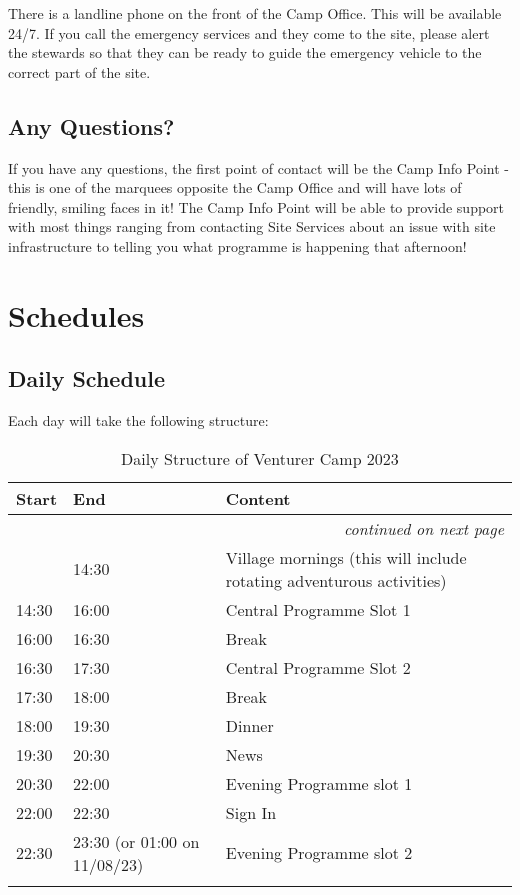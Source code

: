 \documentclass[a4paper, 11pt]{report}
\begin{document}
There is a landline phone on the front of the Camp Office. This will be available 24/7. \nl
If you call the emergency services and they come to the site, please alert the stewards so that they can be ready to guide the emergency vehicle to the correct part of the site. 

\section{Any Questions?}
If you have any questions, the first point of contact will be the Camp Info Point - this is one of the marquees opposite the Camp Office and will have lots of friendly, smiling faces in it!\nl
The Camp Info Point will be able to provide support with most things ranging from contacting Site Services about an issue with site infrastructure to telling you what programme is happening that afternoon!

\chapter{Schedules}
\section{Daily Schedule}
Each day will take the following structure:

{\RaggedRight \centering
\begin{longtable}{p{} p{} p{}}
\textbf{Start} & \textbf{End} & \textbf{Content} \\ 
\hline
\endhead

\multicolumn{3}{r}{\footnotesize\itshape continued on next page}\\
\endfoot 

\endlastfoot

& 14:30 & Village mornings (this will include rotating adventurous activities) \\ 
\hline
14:30 & 16:00 & Central Programme Slot 1 \\ 
\hline
16:00 & 16:30 & Break \\ 
\hline
16:30 & 17:30 & Central Programme Slot 2 \\ 
\hline
17:30 & 18:00 & Break \\ 
\hline
18:00 & 19:30 & Dinner \\ 
\hline
19:30 & 20:30 & News \\ 
\hline
20:30 & 22:00 & Evening Programme slot 1 \\ 
\hline
22:00 & 22:30 & Sign In \\ 
\hline
22:30 & 23:30 \newline (or 01:00 on 11/08/23) & Evening Programme slot 2 \\ 
\hline

\caption{Daily Structure of Venturer Camp 2023}
\end{longtable}
}%
\end{document}
